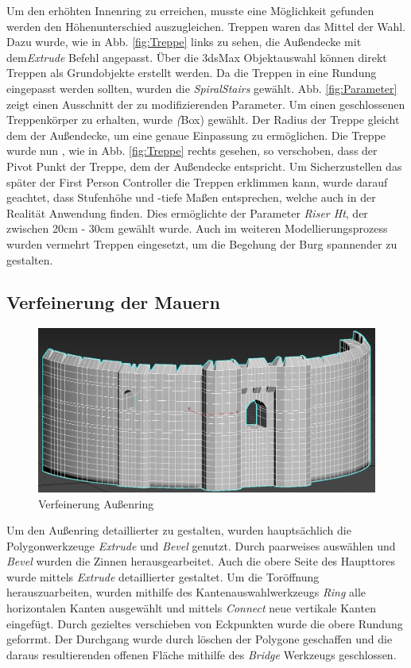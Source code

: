 Um den erhöhten Innenring zu erreichen, musste eine Möglichkeit gefunden werden den Höhenunterschied auszugleichen. Treppen waren das Mittel der Wahl. Dazu wurde, wie in Abb. \ref{fig:Treppe} links zu sehen, die Außendecke mit dem\textit{Extrude} Befehl angepasst. Über die 3dsMax Objektauswahl können direkt Treppen als Grundobjekte erstellt werden. Da die Treppen in eine Rundung eingepasst werden sollten, wurden die \textit{SpiralStairs} gewählt. Abb. \ref{fig:Parameter} zeigt einen Ausschnitt der zu modifizierenden Parameter. Um einen geschlossenen Treppenkörper zu erhalten, wurde \textit(Box) gewählt. Der Radius der Treppe gleicht dem der Außendecke, um eine genaue Einpassung zu ermöglichen. Die Treppe wurde nun , wie in Abb. \ref{fig:Treppe} rechts gesehen, so verschoben, dass der Pivot Punkt der Treppe, dem der Außendecke entspricht. Um Sicherzustellen das später der First Person Controller die Treppen erklimmen kann, wurde darauf geachtet, dass Stufenhöhe und -tiefe Maßen entsprechen, welche auch in der Realität Anwendung finden. Dies ermöglichte der Parameter \textit{Riser Ht}, der zwischen 20cm - 30cm gewählt wurde. Auch im weiteren Modellierungsprozess wurden vermehrt Treppen eingesetzt, um die Begehung der Burg spannender zu gestalten.

\newpage
\subsection{Verfeinerung der Mauern}

\begin{figure}[h]
	\centering
	\includegraphics[width=0.95 \linewidth]{Abbildungen/3dsMax/Aussenring}
	\caption{Verfeinerung Außenring}
	\label{fig:Aussenring}
\end{figure}

Um den Außenring detaillierter zu gestalten, wurden hauptsächlich die Polygonwerkzeuge \textit{Extrude} und \textit{Bevel} genutzt. Durch paarweises auswählen und \textit{Bevel} wurden die Zinnen herausgearbeitet. Auch die obere Seite des Haupttores wurde mittels \textit{Extrude} detaillierter gestaltet. Um die Toröffnung herauszuarbeiten, wurden mithilfe des Kantenauswahlwerkzeugs \textit{Ring} alle horizontalen Kanten ausgewählt und mittels \textit{Connect} neue vertikale Kanten eingefügt. Durch gezieltes verschieben von Eckpunkten wurde die obere Rundung geforrmt. Der Durchgang wurde durch löschen der Polygone geschaffen und die daraus resultierenden offenen Fläche mithilfe des \textit{Bridge} Werkzeugs geschlossen. 

